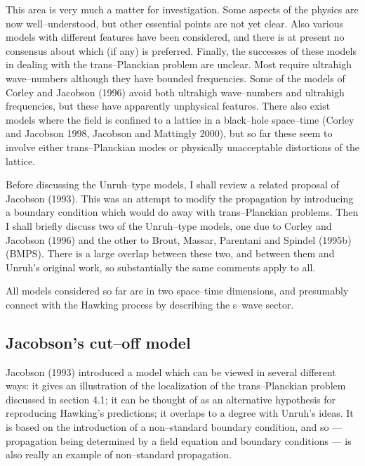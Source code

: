 This area is very much a matter for investigation.  Some aspects of the physics
are now well--understood, but other essential points are not yet clear.  Also
various models with different features have been considered, and there is at
present no consensus about which (if any) is preferred. Finally, the successes
of these models in dealing with the trans--Planckian problem are unclear.  Most
require ultrahigh wave--numbers although they have bounded frequencies.  Some
of the models of Corley and Jacobson (1996) avoid both ultrahigh wave--numbers
and ultrahigh frequencies, but these have apparently unphysical features. 
There also exist models where the field is confined to a lattice in a
black--hole space--time (Corley and Jacobson 1998, Jacobson and Mattingly
2000), but so far these seem to involve either trans--Planckian modes or
physically unacceptable distortions of the lattice.

Before discussing the Unruh--type models, I shall review a related proposal of
Jacobson (1993).  This was an attempt to modify the
propagation by introducing a boundary condition which would do away with
trans--Planckian problems.  Then
I shall briefly discuss two of the Unruh--type
models, one due to Corley and Jacobson
(1996) and the other to Brout, Massar, Parentani and Spindel (1995b) (BMPS).  
There is a large overlap between these two, and between them and Unruh's
original work, so substantially the same comments apply to all.

All models considered so far are in two space--time dimensions, and presumably
connect with the Hawking process by describing the s--wave sector.

\subsection{Jacobson's cut--off model}

Jacobson (1993) introduced a model which can be viewed in several
different ways:  it gives an illustration of the
localization of the trans--Planckian problem discussed in section 4.1; it can
be thought of as an alternative hypothesis for reproducing Hawking's
predictions; it overlaps to a degree with Unruh's ideas.  It is based
on the introduction of a non--standard boundary condition, and so ---
propagation being determined by a field equation and
boundary conditions --- is also really an example of non--standard
propagation.

